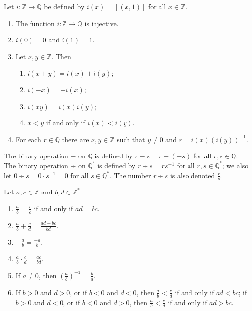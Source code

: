 \begin{theorem} %
	\label{rat:t:int}
	Let $i: \mathbb{Z} \to \mathbb{Q}$ be defined by $i(x) = [(x, 1)]$ for all $x \in \mathbb{Z}$.
	\begin{enumerate}
		\item The function $i: \mathbb{Z} \to \mathbb{Q}$ is injective. \label{rat:t:int:injective}
		\item $i(0) = \overline{0}$ and $i(1) = \overline{1}$. \label{rat:t:int:zero_one}
		\item Let $x, y \in \mathbb{Z}$. Then
		      \begin{enumerate}
			      \item $i(x + y) = i(x) + i(y)$;
			      \item $i(-x) = -i(x)$;
			      \item $i(x y) = i(x) i(y)$;
			      \item $x < y$ if and only if $i(x) < i(y)$.
		      \end{enumerate} \label{rat:t:int:props}
		\item For each $r \in \mathbb{Q}$ there are $x, y \in \mathbb{Z}$ such that $y \neq 0$ and $r = i(x)(i(y))^{-1}$.
	\end{enumerate}
\end{theorem}

\begin{definition} %
	The binary operation $-$ on $\mathbb{Q}$ is defined by $r - s = r + (-s)$ for all $r, s \in \mathbb{Q}$. The binary operation $\div$ on $\mathbb{Q}^{*}$ is defined by $r \div s = r s^{-1}$ for all $r, s \in \mathbb{Q}^{*}$; we also let $0 \div s = 0 \cdot s^{-1} = 0$ for all $s \in \mathbb{Q}^{*}$. The number $r \div s$ is also denoted $\frac{r}{s}$.
\end{definition}

\begin{lemma} %
	Let $a, c \in \mathbb{Z}$ and $b, d \in \mathbb{Z}^{*}$.
	\begin{enumerate}
		\item $\frac{a}{b} = \frac{c}{d}$ if and only if $a d = b c$.
		\item $\frac{a}{b} + \frac{c}{d} = \frac{a d + b c}{b d}$.
		\item $-\frac{a}{b} = \frac{-a}{b}$.
		\item $\frac{a}{b} \cdot \frac{c}{d} = \frac{a c}{b d}$.
		\item If $a \neq 0$, then $\left( \frac{a}{b} \right)^{-1} = \frac{b}{a}$.
		\item If $b > 0$ and $d > 0$, or if $b < 0$ and $d < 0$, then $\frac{a}{b} < \frac{c}{d}$ if and only if $a d < b c$; if $b > 0$ and $d < 0$, or if $b < 0$ and $d > 0$, then $\frac{a}{b} < \frac{c}{d}$ if and only if $a d > b c$.
	\end{enumerate}
\end{lemma}

